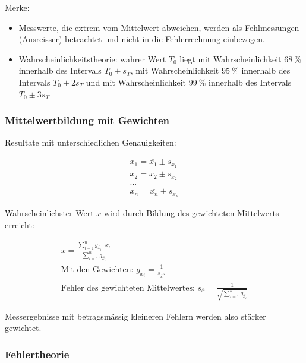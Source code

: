 Merke:

\begin{itemize}
    \item
        Messwerte,   die  extrem   vom   Mittelwert   abweichen,  werden   als
        Fehlmessungen (Ausreisser) betrachtet und  nicht in die Fehlerrechnung
        einbezogen.
    \item
        Wahrscheinlichkeitstheorie:    wahrer    Wert    $T_0$    liegt    mit
        Wahrscheinlichkeit  $\SI{68}{\percent}$ innerhalb  des Intervals  $T_0
        \pm   s_T$,  mit   Wahrscheinlichkeit  $\SI{95}{\percent}$   innerhalb
        des   Intervals    $T_0 \pm  2  s_T$   und    mit   Wahrscheinlichkeit
        $\SI{99}{\percent}$ innerhalb des Intervals $T_0 \pm 3 s_T$
\end{itemize}

\subsubsection{Mittelwertbildung mit Gewichten}

Resultate mit unterschiedlichen Genauigkeiten:

\begin{gather}
    x_1 = \overline{x_1} \pm s_{\overline{x_1}} \\
    x_2 = \overline{x_2} \pm s_{\overline{x_2}} \\
    \text{...} \\
    x_n = \overline{x_n} \pm s_{\overline{x_n}}
\end{gather}

Wahrscheinlichster  Wert $\overline{x}$  wird  durch  Bildung des  gewichteten
Mittelwerts erreicht:

\begin{gather}
    \overline{x} = \frac{ \sum_{i=1}^n{ g_{\overline{x_i}} \cdot x_i } }{ \sum_{i=1}^n{ g_{\overline{x_i}} }{  } } \\
    \text{Mit den Gewichten: } g_{\overline{x_i}} = \frac{1}{s_{\overline{x_i}^2}} \\
    \text{Fehler des gewichteten Mittelwertes: } s_{\overline{x}} = \frac{1}{\sqrt{\sum_{i=1}^n{g_{\overline{x_i}}}}}
\end{gather}

Messergebnisse  mit betragsm\"assig  kleineren Fehlern  werden also  st\"arker
gewichtet.

\subsubsection{Fehlertheorie}

